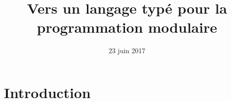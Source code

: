 \documentclass{beamer}
\begin{document}
\title{Vers un langage typé pour la programmation modulaire}
\date{23 juin 2017}

\maketitle

\begin{frame}[plain]
	\tableofcontents
\end{frame}

\section{Introduction}

\begin{frame}[plain]
\end{frame}
\end{document}
